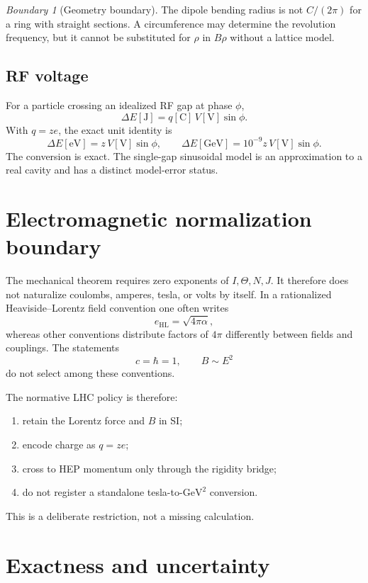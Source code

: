 \documentclass[11pt,a4paper]{article}
\theoremstyle{definition}
\theoremstyle{plain}
\theoremstyle{remark}
\newtheorem{warning}[definition]{Boundary}
\newcommand{\GeV}{\mathrm{GeV}}
\begin{document}
\begin{warning}[Geometry boundary]
The dipole bending radius is not \(C/(2\pi)\) for a ring with straight
sections. A circumference may determine the revolution frequency, but
it cannot be substituted for \(\rho\) in \(B\rho\) without a lattice
model.
\end{warning}

\subsection{RF voltage}

For a particle crossing an idealized RF gap at phase \(\phi\),
\[
\Delta E[\mathrm J]=q[\mathrm C]\,V[\mathrm V]\sin\phi.
\]
With \(q=ze\), the exact unit identity is
\[
\boxed{
\Delta E[\mathrm{eV}]=z\,V[\mathrm V]\sin\phi,\qquad
\Delta E[\GeV]=10^{-9}z\,V[\mathrm V]\sin\phi.
}
\]
The conversion is exact. The single-gap sinusoidal model is an
approximation to a real cavity and has a distinct model-error status.

\section{Electromagnetic normalization boundary}

The mechanical theorem requires zero exponents of \(I,\Theta,N,J\).
It therefore does not naturalize coulombs, amperes, tesla, or volts
by itself. In a rationalized Heaviside--Lorentz field convention one
often writes
\[
e_{\mathrm{HL}}=\sqrt{4\pi\alpha},
\]
whereas other conventions distribute factors of \(4\pi\) differently
between fields and couplings. The statements
\[
c=\hbar=1,\qquad B\sim E^2
\]
do not select among these conventions.

The normative LHC policy is therefore:
\begin{enumerate}[label=(\alph*)]
  \item retain the Lorentz force and \(B\) in SI;
  \item encode charge as \(q=ze\);
  \item cross to HEP momentum only through the rigidity bridge;
  \item do not register a standalone tesla-to-\(\GeV^2\) conversion.
\end{enumerate}
This is a deliberate restriction, not a missing calculation.

\section{Exactness and uncertainty}
\end{document}
